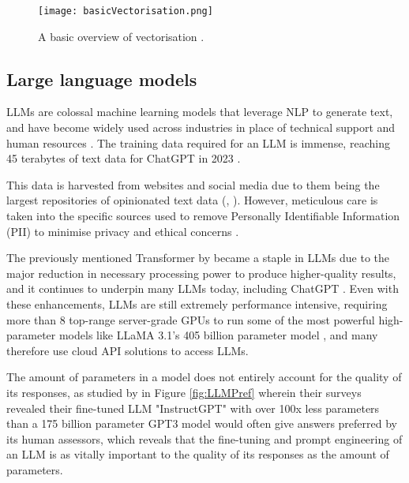 \begin{figure}[H]
    \centering
    \texttt{[image: basicVectorisation.png]}
    \caption{A basic overview of vectorisation \autocite{openai_introducing_nodate}.}
    \label{fig:basicVectorisation}
\end{figure}


\pagebreak 

\subsection{Large language models}
LLMs are colossal machine learning models that leverage NLP to generate text, and have become widely used across 
industries in place of technical support and human resources \autocite{vrontis_artificial_2022}. The training data required for an LLM is immense, 
reaching 45 terabytes of text data for ChatGPT in 2023 \autocite{dwivedi_so_2023}. 

This data is harvested from websites and social media due to them being the largest repositories of 
opinionated text data (\textcite{dubey_llama_2024}, \textcite{wang_fine-grained_2016}). 
However, meticulous care is taken into the specific sources used to remove 
Personally Identifiable Information (PII) to minimise privacy and ethical concerns \autocite{dubey_llama_2024}.

The previously mentioned Transformer by \textcite{vaswani_attention_2017} 
became a staple in LLMs due to the major reduction in necessary processing power to produce higher-quality 
results, and it continues to underpin many LLMs today, including ChatGPT \autocite{brown_language_2020}. 
Even with these enhancements, LLMs are still extremely performance intensive,
requiring more than 8 top-range server-grade GPUs to run some of the most powerful high-parameter models like LLaMA 3.1's 405 billion parameter model \autocite{dubey_llama_2024},
and many therefore use cloud API solutions to access LLMs.

The amount of parameters in a model does not entirely account for the quality of its responses, as studied by \textcite{ouyang_training_2022}
in Figure \ref{fig:LLMPref} wherein their surveys revealed their fine-tuned LLM "InstructGPT" with over 100x less parameters than a 175 billion parameter 
GPT3 model would often give answers preferred by its human assessors, which reveals that the fine-tuning and prompt engineering of an LLM is as vitally important
to the quality of its responses as the amount of parameters.  

